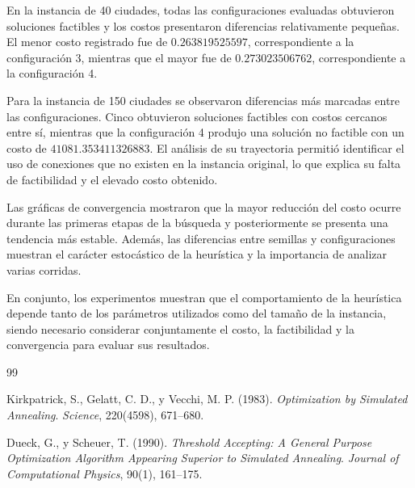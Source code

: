 \documentclass[12pt,a4paper]{article}
\begin{document}
En la instancia de 40 ciudades, todas las configuraciones evaluadas obtuvieron soluciones factibles y los costos presentaron diferencias relativamente pequeñas. El menor costo registrado fue de $0.263819525597$, correspondiente a la configuración 3, mientras que el mayor fue de $0.273023506762$, correspondiente a la configuración 4.

Para la instancia de 150 ciudades se observaron diferencias más marcadas entre las configuraciones. Cinco obtuvieron soluciones factibles con costos cercanos entre sí, mientras que la configuración 4 produjo una solución no factible con un costo de $41081.353411326883$. El análisis de su trayectoria permitió identificar el uso de conexiones que no existen en la instancia original, lo que explica su falta de factibilidad y el elevado costo obtenido.

Las gráficas de convergencia mostraron que la mayor reducción del costo ocurre durante las primeras etapas de la búsqueda y posteriormente se presenta una tendencia más estable. Además, las diferencias entre semillas y configuraciones muestran el carácter estocástico de la heurística y la importancia de analizar varias corridas.

En conjunto, los experimentos muestran que el comportamiento de la heurística depende tanto de los parámetros utilizados como del tamaño de la instancia, siendo necesario considerar conjuntamente el costo, la factibilidad y la convergencia para evaluar sus resultados.


\begin{thebibliography}{99}

Kirkpatrick, S., Gelatt, C. D., y Vecchi, M. P. (1983).
\textit{Optimization by Simulated Annealing}.
\textit{Science}, 220(4598), 671--680.

Dueck, G., y Scheuer, T. (1990).
\textit{Threshold Accepting: A General Purpose Optimization Algorithm Appearing Superior to Simulated Annealing}.
\textit{Journal of Computational Physics}, 90(1), 161--175.

\end{thebibliography}
\end{document}
